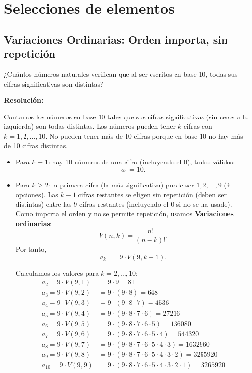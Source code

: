 \documentclass[a4paper,12pt]{article}
\begin{document}
\section{Selecciones de elementos}

\subsection{Variaciones Ordinarias: Orden importa, sin repetición}

\begin{ejercicio}[title=Ejercicio 46 (⋆)]
¿Cuántos números naturales verifican que al ser escritos en base 10, todas sus cifras significativas son distintas?

\tcblower
\textbf{Resolución:}

Contamos los números en base 10 tales que sus cifras significativas (sin ceros a la izquierda) son todas distintas. Los números pueden tener \(k\) cifras con \(k=1,2,\dots,10\). No pueden tener más de 10 cifras porque en base 10 no hay más de 10 cifras distintas.

\begin{itemize}
\item Para \(k=1\): hay 10 números de una cifra (incluyendo el 0), todos válidos:
\[
a_1 = 10.
\]

\item Para \(k\ge 2\): la primera cifra (la más significativa) puede ser \(1,2,\dots,9\) (9 opciones). Las \(k-1\) cifras restantes se eligen sin repetición (deben ser distintas) entre las 9 cifras restantes (incluyendo el 0 si no se ha usado). Como importa el orden y no se permite repetición, usamos \textbf{Variaciones ordinarias}:
\[
V(n,k)=\frac{n!}{(n-k)!}.
\]
Por tanto,
\[
a_k \;=\; 9\cdot V(9,k-1).
\]

Calculamos los valores para \(k=2,\dots,10\):
\[
\begin{aligned}
a_2 = 9\cdot V(9,1) &= 9\cdot 9 = 81 \\
a_3 = 9\cdot V(9,2) &= 9\cdot (9\cdot 8) = 648 \\
a_4 = 9\cdot V(9,3) &= 9\cdot (9\cdot 8\cdot 7) = 4536 \\
a_5 = 9\cdot V(9,4) &= 9\cdot (9\cdot 8\cdot 7\cdot 6) = 27216 \\
a_6 = 9\cdot V(9,5) &= 9\cdot (9\cdot 8\cdot 7\cdot 6\cdot 5) = 136080 \\
a_7 = 9\cdot V(9,6) &= 9\cdot (9\cdot 8\cdot 7\cdot 6\cdot 5\cdot 4) = 544320 \\
a_8 = 9\cdot V(9,7) &= 9\cdot (9\cdot 8\cdot 7\cdot 6\cdot 5\cdot 4\cdot 3) = 1632960 \\
a_9 = 9\cdot V(9,8) &= 9\cdot (9\cdot 8\cdot 7\cdot 6\cdot 5\cdot 4\cdot 3\cdot 2) = 3265920 \\
a_{10} = 9\cdot V(9,9) &= 9\cdot (9\cdot 8\cdot 7\cdot 6\cdot 5\cdot 4\cdot 3\cdot 2\cdot 1) = 3265920
\end{aligned}
\]


\end{itemize}
\end{ejercicio}
\end{document}
